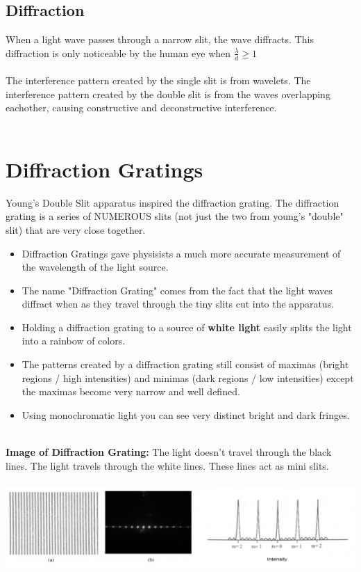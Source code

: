 \documentclass{article}
\begin{document}
\subsection{Diffraction}
When a light wave passes through a narrow slit, the wave diffracts. This diffraction is only noticeable by the human eye when $\frac{\lambda}{d} \geq 1$ \\\\
The interference pattern created by the single slit is from wavelets. The interference pattern created by the double slit is from the waves overlapping eachother, causing constructive and deconstructive interference. \\\\

\section{Diffraction Gratings}
Young's Double Slit apparatus inspired the diffraction grating. The diffraction grating is a series of NUMEROUS slits (not just the two from young's "double" slit) that are very close together.\\
\begin{itemize}
    \item Diffraction Gratings gave physisists a much more accurate measurement of the wavelength of the light source.
    \item The name "Diffraction Grating" comes from the fact that the light waves diffract when as they travel through the tiny slits cut into the apparatus.
    \item Holding a diffraction grating to a source of \textbf{white light} easily splits the light into a rainbow of colors.
    \item The patterns created by a diffraction grating still consist of maximas (bright regions / high intensities) and minimas (dark regions / low intensities) except the maximas become very narrow and well defined.
    \item Using monochromatic light you can see very distinct bright and dark fringes.
\end{itemize}\leavevmode\\
\noindent\textbf{Image of Diffraction Grating:}
The light doesn't travel through the black lines. The light travels through the white lines. These lines act as mini slits.\\\\
\includegraphics[scale=0.4]{images/diffraction_grating} \\
\end{document}

